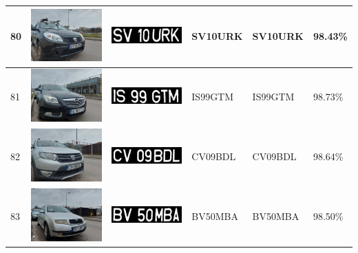 \documentclass[a4paper,12pt]{report}
\begin{document}
\begin{longtable}{| m{0.6cm} | m{3cm} | m{3cm} | m{1.8cm} | m{1.8cm} | m{1.8cm} |}
    80  & \includegraphics[width=3cm,keepaspectratio]{dataset/45_s1.jpg}  & \includegraphics[width=3cm,keepaspectratio]{segmentari/80.jpg}  & SV10URK             & SV10URK              & 98.43\%    \\ \hline
    81  & \includegraphics[width=3cm,keepaspectratio]{dataset/46_s1.jpg}  & \includegraphics[width=3cm,keepaspectratio]{segmentari/81.jpg}  & IS99GTM             & IS99GTM              & 98.73\%    \\ \hline
    82  & \includegraphics[width=3cm,keepaspectratio]{dataset/47_s1.jpg}  & \includegraphics[width=3cm,keepaspectratio]{segmentari/82.jpg}  & CV09BDL             & CV09BDL              & 98.64\%    \\ \hline
    83  & \includegraphics[width=3cm,keepaspectratio]{dataset/48_s1.jpg}  & \includegraphics[width=3cm,keepaspectratio]{segmentari/83.jpg}  & BV50MBA             & BV50MBA              & 98.50\%    \\ \hline

\end{longtable}
\end{document}
